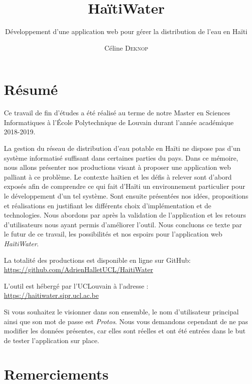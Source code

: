 \documentclass{EPL-master-thesis-covers-FR}
\title{HaïtiWater}
\subtitle{Développement d'une application web pour gérer la distribution de l'eau en Haïti}
\author{Céline \textsc{Deknop}}
\begin{document}
	\maketitle
	\tableofcontents

	\setlength{\parskip}{1.5em plus1em minus1em}


	\chapter*{Résumé}

		Ce travail de fin d'études a été réalisé au terme de notre Master en Sciences Informatiques à l'École Polytechnique de Louvain durant l'année académique 2018-2019.

		La gestion du réseau de distribution d'eau potable en Haïti ne dispose pas d'un système informatisé suffisant dans certaines parties du pays. Dans ce mémoire, nous allons présenter nos productions visant à proposer une application web palliant à ce problème. Le contexte haïtien et les défis à relever sont d'abord exposés afin de comprendre ce qui fait d'Haïti un environnement particulier pour le développement d'un tel système. Sont ensuite présentées nos idées, propositions et réalisations en justifiant les différents choix d'implémentation et de technologies. Nous abordons par après la validation de l'application et les retours d'utilisateurs nous ayant permis d'améliorer l'outil. Nous concluons ce texte par le futur de ce travail, les possibilités et nos espoirs pour l'application web \emph{HaïtiWater}.

		La totalité des productions est disponible en ligne sur GitHub:\\ \url{https://github.com/AdrienHalletUCL/HaitiWater}

		L'outil est hébergé par l'UCLouvain à l'adresse : \\ \url{https://haitiwater.sipr.ucl.ac.be}

		Si vous souhaitez le visionner dans son ensemble, le nom d'utilisateur principal ainsi que son mot de passe est \emph{Protos}. Nous vous demandons cependant de ne pas modifier les données présentes, car elles sont réelles et ont été entrées dans le but de tester l'application sur place.

	\chapter*{Remerciements}
\end{document}
